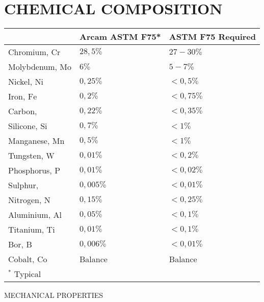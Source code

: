 \documentclass[10pt]{article}
\begin{document}
\section*{CHEMICAL COMPOSITION}
\begin{center}
\begin{tabular}{lll}
 & Arcam ASTM F75* & ASTM F75 Required \\
\hline
Chromium, $\mathrm{Cr}$ & $28,5 \%$ & $27-30 \%$ \\
\hline
Molybdenum, Mo & $6 \%$ & $5-7 \%$ \\
\hline
Nickel, $\mathrm{Ni}$ & $0,25 \%$ & $<0,5 \%$ \\
\hline
Iron, $\mathrm{Fe}$ & $0,2 \%$ & $<0,75 \%$ \\
\hline
Carbon, & $0,22 \%$ & $<0,35 \%$ \\
\hline
Silicone, $\mathrm{Si}$ & $0,7 \%$ & $<1 \%$ \\
\hline
Manganese, $\mathrm{Mn}$ & $0,5 \%$ & $<1 \%$ \\
\hline
Tungsten, W & $0,01 \%$ & $<0,2 \%$ \\
\hline
Phosphorus, $\mathrm{P}$ & $0,01 \%$ & $<0,02 \%$ \\
\hline
Sulphur, & $0,005 \%$ & $<0,01 \%$ \\
\hline
Nitrogen, $\mathrm{N}$ & $0,15 \%$ & $<0,25 \%$ \\
\hline
Aluminium, Al & $0,05 \%$ & $<0,1 \%$ \\
\hline
Titanium, $\mathrm{Ti}$ & $0,01 \%$ & $<0,1 \%$ \\
\hline
Bor, $\mathrm{B}$ & $0,006 \%$ & $<0,01 \%$ \\
\hline
Cobalt, $\mathrm{Co}$ & Balance & Balance \\
\hline
${ }^{*}$ Typical &  &  \\
\hline
\end{tabular}
\end{center}

MECHANICAL PROPERTIES
\end{document}
